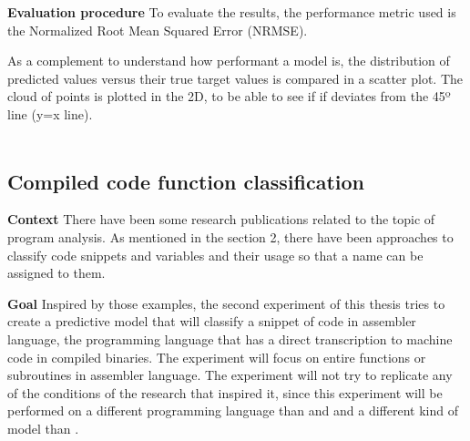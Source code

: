 \textbf{Evaluation procedure}
To evaluate the results, the performance metric used is the Normalized Root Mean Squared Error (NRMSE). 

As a complement to understand how performant a model is, the distribution of predicted values versus their true target values is compared in a scatter plot. The cloud of points is plotted in the 2D, to be able to see if if deviates from the 45º line (y=x line). \\
\\




\subsection{Compiled code function classification}

\textbf{Context}
There have been some research publications related to the topic of program analysis. As mentioned in the section 2, there have been approaches to classify code snippets \cite{code2vec} and variables \cite{139} and their usage so that a name can be assigned to them. 

\textbf{Goal}
Inspired by those examples, the second experiment of this thesis tries to create a predictive model that will classify a snippet of code in assembler language, the programming language that has a direct transcription to machine code in compiled binaries. The experiment will focus on entire functions or subroutines in assembler language. The experiment will not try to replicate any of the conditions of the research that inspired it, since this experiment will be performed on a different programming language than \cite{139} and \cite{code2vec} and a different kind of model than \cite{code2vec}.

